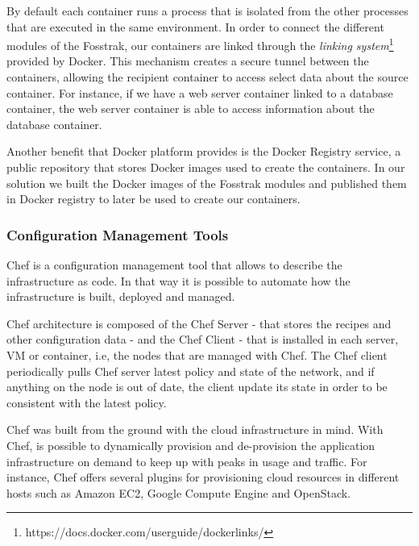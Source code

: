 By default each container runs a process that is isolated from the other processes that are executed in
the same environment. In order to connect the different modules of the Fosstrak, our containers are
linked through the \textit{linking system}\footnote{https://docs.docker.com/userguide/dockerlinks/} provided by Docker.
This mechanism creates a secure tunnel between the containers, allowing the recipient container to access select
data about the source container. For instance, if we have a web server container linked to a
database container, the web server container is able to access information about the database container.

Another benefit that Docker platform provides is the Docker Registry service, a public repository that stores
Docker images used to create the containers. In our solution we built the Docker images of the Fosstrak modules
and published them in Docker registry to later be used to create our containers.
\subsubsection{Configuration Management Tools}
\label{subs:cm_tools}
Chef is a configuration management tool that allows to describe the infrastructure as code. In that way
it is possible to automate how the infrastructure is built, deployed and managed.

Chef architecture is composed of the Chef Server - that stores the recipes and other configuration data -
and the  Chef Client - that is installed in each server, VM or container, i.e, the nodes that are managed with Chef.
The Chef client periodically pulls Chef server latest policy and state of the network, and if anything on the
node is out of date, the client update its state in order to be consistent with the latest policy.

Chef was built from the ground with the cloud infrastructure in mind. With Chef, is possible to dynamically
provision and de-provision the application infrastructure on demand to keep up with peaks in usage and traffic.
For instance, Chef offers several plugins for provisioning cloud resources in different hosts such as
Amazon EC2, Google Compute Engine and OpenStack.
